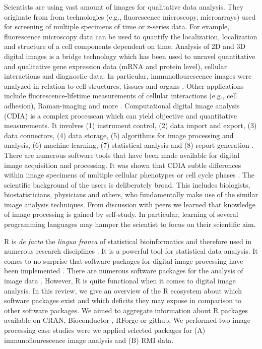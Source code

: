Scientists are using vast amount of images for qualitative data analysis. They 
originate from from technologies (e.g., fluorescence microscopy, microarrays) 
used for screening of multiple specimens of time or z-series data. For example, 
fluorescence microscopy data can be used to quantify the localization, 
localization and structure of a cell components dependent on time. Analysis of 
2D and 3D digital images is a bridge technology which has been used to unravel 
quantitative and qualitative gene expression data (mRNA and protein level), 
cellular interactions and diagnostic data. In particular, immunoflourescence 
images were analyzed in relation to cell structures, tissues and organs 
\citep{chieco_image_2013, rodiger_highly_2013, schierack_species-specific_2014, 
willitzki_new_2012}. Other applications include fluorescence-lifetime 
measurements of cellular interactions (e.g., cell adhesion), Raman-imaging and more
\citep{eliceiri_biological_2012, schierack_species-specific_2014, vogler_separation_2010}. Computational 
digital image analysis (CDIA) is a complex processcan which can yield objective 
and quantitative measurements. It involves (1) instrument control, (2) data 
import and export, (3) data connectors, (4) data storage, (5) algorithms for 
image processing and analysis, (6) machine-learning, (7) statistical analysis 
and (8) report generation \citep{eliceiri_biological_2012}. There are numerous 
software tools that have been made available for digital image acquisition and 
processing. It was shown that CDIA subtle differences within image specimens of 
multiple cellular phenotypes or cell cycle phases \citep{chieco_image_2013, 
eliceiri_biological_2012, ljosa_introduction_2009, wiesmann_review_2015}. The 
scientific background of the users is deliberately broad. This includes 
biologists, biostatisticians, physicians and others, who fundamentally make use 
of the similar image analysis techniques. From discussion with peers we learned 
that knowledge of image processing is gained by self-study. In particular, 
learning of several programming languages may hamper the scientist to focus on 
their scientific aim.

R \citep{R} is \textit{de facto} the \textit{lingua franca} of statistical 
bioinformatics and therefore used in numerous research disciplines 
\citep{rodiger_r_2015}. It is a powerful tool for statistical data analysis. It 
comes to no surprise that software packages for digital image processing have 
been implemented \citep{frery_introduction_2013}. There are numerous software 
packages for the analysis of image data \citep{wiesmann_review_2015}. However, R 
is quite functional when it comes to digital image analysis. In this review, we 
give an overview of the R ecosystem about which software packages exist and 
which deficits they may expose in comparison to other software packages. We 
aimed to aggregate information about R packages available on CRAN, Bioconductor 
\citep{gentleman_bioconductor:_2004}, RForge or github. We performed two image 
processing case studies were we applied selected packages for (A) 
immunoflourescence image analysis and (B) RMI data. 

